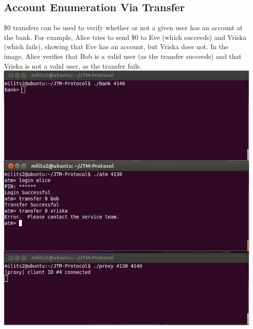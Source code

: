 \documentclass{article}
\begin{document}
\subsection{Account Enumeration Via Transfer}
\$0 transfers can be used to verify whether or not a given user has an account at the bank. For example, Alice tries to send \$0 to Eve (which succeeds) and Vriska (which fails), showing that Eve has an account, but Vriska does not. In the image, Alice verifies that Bob is a valid user (as the transfer succeeds) and that Vriska is not a valid user, as the transfer fails.
\\
\includegraphics[scale=0.85]{transferUser.png}
\\
\end{document}
